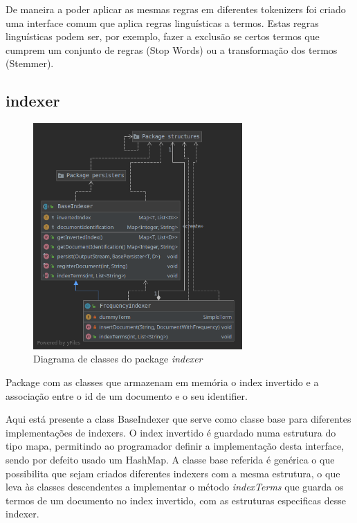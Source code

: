 \documentclass[12pt]{article}
\begin{document}
De maneira a poder aplicar as mesmas regras em diferentes tokenizers
foi criado uma interface comum que aplica regras linguísticas a termos.
Estas regras linguísticas podem ser, por exemplo, fazer a exclusão se certos termos
que cumprem um conjunto de regras (Stop Words) ou a transformação dos termos (Stemmer).

\subsection{indexer}
\begin{figure}[H]
  \center
  \includegraphics[width=8cm]{packages_indexer.png}
  \caption{Diagrama de classes do package \it indexer}
\end{figure}

Package com as classes que armazenam em memória o index invertido e
a associação entre o id de um documento e o seu identifier.

Aqui está presente a class BaseIndexer que serve como classe base para
diferentes implementações de indexers. O index invertido é guardado numa
estrutura do tipo mapa, permitindo ao programador definir a implementação
desta interface, sendo por defeito usado um HashMap. A classe base referida
é genérica o que possibilita que sejam criados diferentes indexers com a
mesma estrutura, o que leva às classes descendentes a implementar o método
{\it indexTerms} que guarda os termos de um documento no index invertido,
com as estruturas especificas desse indexer.
\end{document}
